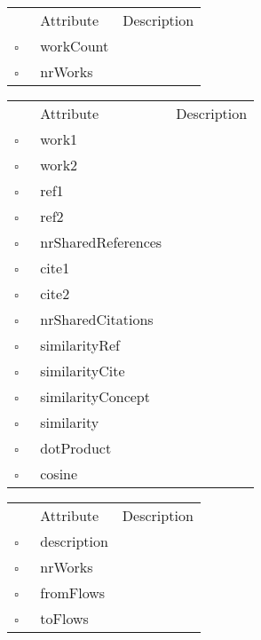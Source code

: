 \begin{table}
\caption{ScopusCountry  }

\begin{longtable}{llp{8cm}}
& Attribute & Description \\
$\square$\ & workCount &  \\
$\square$\ & nrWorks &  \\
\end{longtable}
\label{attr:ScopusCountry}
\end{table}

\clearpage
\begin{table}
\caption{Similarity  }

\begin{longtable}{llp{8cm}}
& Attribute & Description \\
$\square$\ & work1 &  \\
$\square$\ & work2 &  \\
$\square$\ & ref1 &  \\
$\square$\ & ref2 &  \\
$\square$\ & nrSharedReferences &  \\
$\square$\ & cite1 &  \\
$\square$\ & cite2 &  \\
$\square$\ & nrSharedCitations &  \\
$\square$\ & similarityRef &  \\
$\square$\ & similarityCite &  \\
$\square$\ & similarityConcept &  \\
$\square$\ & similarity &  \\
$\square$\ & dotProduct &  \\
$\square$\ & cosine &  \\
\end{longtable}
\label{attr:Similarity}
\end{table}

\begin{table}
\caption{SourceGroup  }

\begin{longtable}{llp{8cm}}
& Attribute & Description \\
$\square$\ & description &  \\
$\square$\ & nrWorks &  \\
$\square$\ & fromFlows &  \\
$\square$\ & toFlows &  \\
\end{longtable}
\label{attr:SourceGroup}
\end{table}

